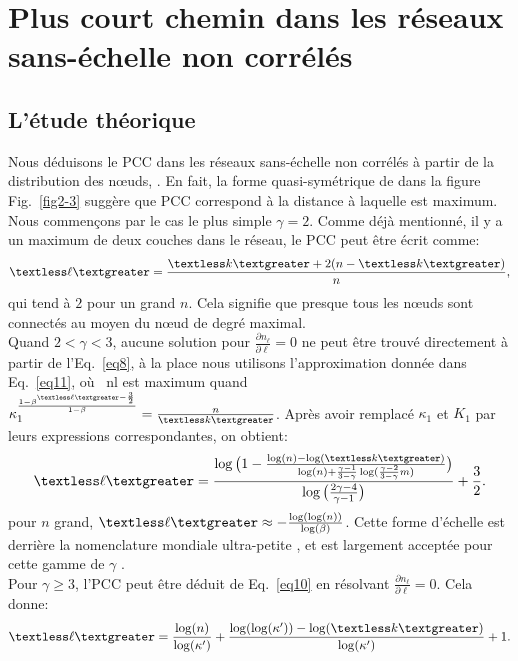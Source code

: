 \section{Plus court chemin dans les réseaux sans-échelle non corrélés }
   \subsection{L'étude théorique}
   \label{pcc}
   Nous déduisons le PCC dans les réseaux sans-échelle non corrélés à partir de la distribution des nœuds, \nl. En fait, la forme quasi-symétrique de \nl dans la figure Fig.~\ref{fig2-3} suggère que PCC correspond à la distance à laquelle \nl est maximum. \\ Nous commençons par le cas le plus simple $\gamma=2$. Comme déjà mentionné, il y a un maximum de deux couches dans le réseau, le PCC peut être écrit comme:
   \begin{align}
   	\textless \ell \textgreater=\frac{\km+2(n-\km)}{n},
   	\label{eq14}  
   \end{align}
qui tend à $2$ pour un grand $n$. Cela signifie que presque tous les nœuds sont connectés au moyen du nœud de degré maximal. \\
Quand $ 2<\gamma<3 $, aucune solution pour $\frac{\partial n_{\ell}}{\partial\ell}=0$ ne peut être trouvé directement à partir de l'Eq.~\eqref{eq8}, à la place nous utilisons l'approximation donnée dans Eq.~\eqref{eq11}, où \ nl est maximum quand $\kappa_1^{\frac{1-\beta^{\textless \ell \textgreater-\frac{3}{2}}}{1-\beta}}=\frac{n}{\km}$. Après avoir remplacé $\kappa_1 $ et $K_1$ par leurs expressions correspondantes, on obtient:
\begin{align}
	\textless \ell \textgreater=\frac{\log\big(1-\frac{\log(n)-\log(\km)}{\log(n)+\frac{\gamma-1}{3-\gamma}\log(\frac{\gamma-2}{3-\gamma}m)}\big)}{\log\big(\frac{2\gamma-4}{\gamma-1}\big)}+\frac{3}{2}.
	\label{eq12}
\end{align}
pour $n$ grand, $\textless \ell \textgreater \approx -\frac{\log(\log(n))}{\log(\beta)}$.
Cette forme d'échelle est derrière la nomenclature mondiale ultra-petite \cite{Cohen-Havlin2003}, et est largement acceptée pour cette gamme de $\gamma $ \cite{Do-al2003,Cohen-al2002,Chung-Lu2002,Fox-Bellwood2014,Hofstad-al2014}.\\
Pour $\gamma\ge 3 $, l'PCC peut être déduit de Eq.~\eqref{eq10} en résolvant $\frac{\partial n_{\ell}}{\partial\ell}=0$. Cela donne:
\begin{align}
	\textless \ell \textgreater=\frac{\log (n)}{\log(\kappa')}+\frac{\log(\log(\kappa'))-\log(\km)}{\log(\kappa')}+1.
	\label{eq13}
\end{align}
